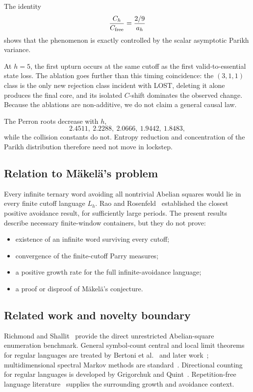 \documentclass[12pt]{article}
\theoremstyle{definition}
\begin{document}
The identity
\[
\frac{C_h}{C_{\rm free}}
=
\frac{2/9}{a_h}
\]
shows that the phenomenon is exactly controlled by the scalar asymptotic Parikh variance.

At \(h=5\), the first upturn occurs at the same cutoff as the first valid-to-essential state loss. The ablation goes further than this timing coincidence: the \((3,1,1)\) class is the only new rejection class incident with LOST, deleting it alone produces the final core, and its isolated \(C\)-shift dominates the observed change. Because the ablations are non-additive, we do not claim a general causal law.

The Perron roots decrease with \(h\),
\[
2.4511,\ 2.2288,\ 2.0666,\ 1.9442,\ 1.8483,
\]
while the collision constants do not. Entropy reduction and concentration of the Parikh distribution therefore need not move in lockstep.

\subsection*{Relation to M\"akel\"a's problem}

Every infinite ternary word avoiding all nontrivial Abelian squares would lie in every finite cutoff language \(L_h\). Rao and Rosenfeld~\cite{Rao2018} established the closest positive avoidance result, for sufficiently large periods. The present results describe necessary finite-window containers, but they do not prove:
\begin{itemize}
\item existence of an infinite word surviving every cutoff;
\item convergence of the finite-cutoff Parry measures;
\item a positive growth rate for the full infinite-avoidance language;
\item a proof or disproof of M\"akel\"a's conjecture.
\end{itemize}

\subsection*{Related work and novelty boundary}

Richmond and Shallit~\cite{Richmond2009} provide the direct unrestricted Abelian-square enumeration benchmark. General symbol-count central and local limit theorems for regular languages are treated by Bertoni et al.~\cite{Bertoni2003} and later work~\cite{Goldwurm2023}; multidimensional spectral Markov methods are standard~\cite{Herve2010}. Directional counting for regular languages is developed by Grigorchuk and Quint~\cite{Grigorchuk2026}. Repetition-free language literature~\cite{Shur2012,Petrova2021} supplies the surrounding growth and avoidance context.
\end{document}
